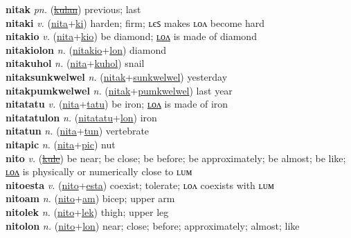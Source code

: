 \textbf{nitak} \textit{pn.} (\hyperref[kulan]{\sout{kulan}})
previous; last \label{nitak} \\
\textbf{nitaki} \textit{v.} (\hyperref[nita]{nita}+\hyperref[ki]{ki})
harden; firm; ʟєꜱ makes ʟᴏᴧ become hard \label{nitaki} \\
\textbf{nitakio} \textit{v.} (\hyperref[nita]{nita}+\hyperref[kio]{kio})
be diamond; \hyperref[nitakiolon]{ʟᴏᴧ} is made of diamond \label{nitakio} \\
\textbf{nitakiolon} \textit{n.} (\hyperref[nitakio]{nitakio}+\hyperref[lon]{lon})
diamond \label{nitakiolon} \\
\textbf{nitakuhol} \textit{n.} (\hyperref[nita]{nita}+\hyperref[kuhol]{kuhol})
snail \label{nitakuhol} \\
\textbf{nitaksunkwelwel} \textit{n.} (\hyperref[nitak]{nitak}+\hyperref[sunkwelwel]{sunkwelwel})
yesterday \label{nitaksunkwelwel} \\
\textbf{nitakpumkwelwel} \textit{n.} (\hyperref[nitak]{nitak}+\hyperref[pumkwelwel]{pumkwelwel})
last year \label{nitakpumkwelwel} \\
\textbf{nitatatu} \textit{v.} (\hyperref[nita]{nita}+\hyperref[tatu]{tatu})
be iron; \hyperref[nitatatulon]{ʟᴏᴧ} is made of iron \label{nitatatu} \\
\textbf{nitatatulon} \textit{n.} (\hyperref[nitatatu]{nitatatu}+\hyperref[lon]{lon})
iron \label{nitatatulon} \\
\textbf{nitatun} \textit{n.} (\hyperref[nita]{nita}+\hyperref[tun]{tun})
vertebrate \label{nitatun} \\
\textbf{nitapic} \textit{n.} (\hyperref[nita]{nita}+\hyperref[pic]{pic})
nut \label{nitapic} \\
\textbf{nito} \textit{v.} (\hyperref[kule]{\sout{kule}})
be near; be close; be before; be approximately; be almost; be like; \hyperref[nitolon]{ʟᴏᴧ} is physically or numerically close to ʟᴜᴍ \label{nito} \\
\textbf{nitoesta} \textit{v.} (\hyperref[nito]{nito}+\hyperref[esta]{esta})
coexist; tolerate; ʟᴏᴧ coexists with ʟᴜᴍ \label{nitoesta} \\
\textbf{nitoam} \textit{n.} (\hyperref[nito]{nito}+\hyperref[am]{am})
bicep; upper arm \label{nitoam} \\
\textbf{nitolek} \textit{n.} (\hyperref[nito]{nito}+\hyperref[lek]{lek})
thigh; upper leg \label{nitolek} \\
\textbf{nitolon} \textit{n.} (\hyperref[nito]{nito}+\hyperref[lon]{lon})
near; close; before; approximately; almost; like \label{nitolon} \\
